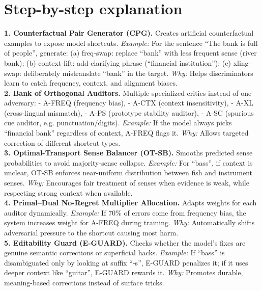 \documentclass[11pt]{article}
\begin{document}
\section{Step-by-step explanation}
\textbf{1. Counterfactual Pair Generator (CPG).}  
Creates artificial counterfactual examples to expose model shortcuts.  
\emph{Example:} For the sentence ``The bank is full of people'', generate:  
(a) freq-swap: replace ``bank'' with less frequent sense (river bank);  
(b) context-lift: add clarifying phrase (``financial institution'');  
(c) xling-swap: deliberately mistranslate ``bank'' in the target.  
\emph{Why:} Helps discriminators learn to catch frequency, context, and alignment biases.\\

\textbf{2. Bank of Orthogonal Auditors.}  
Multiple specialized critics instead of one adversary:  
- A-FREQ (frequency bias),  
- A-CTX (context insensitivity),  
- A-XL (cross-lingual mismatch),  
- A-PS (prototype stability auditor),  
- A-SC (spurious cue auditor, e.g. punctuation/digits).  
\emph{Example:} If the model always picks ``financial bank'' regardless of context, A-FREQ flags it.  
\emph{Why:} Allows targeted correction of different shortcut types.\\

\textbf{3. Optimal-Transport Sense Balancer (OT-SB).}  
Smooths predicted sense probabilities to avoid majority-sense collapse.  
\emph{Example:} For ``bass'', if context is unclear, OT-SB enforces near-uniform distribution between fish and instrument senses.  
\emph{Why:} Encourages fair treatment of senses when evidence is weak, while respecting strong context when available.\\

\textbf{4. Primal--Dual No-Regret Multiplier Allocation.}  
Adapts weights for each auditor dynamically.  
\emph{Example:} If 70\% of errors come from frequency bias, the system increases weight for A-FREQ during training.  
\emph{Why:} Automatically shifts adversarial pressure to the shortcut causing most harm.\\

\textbf{5. Editability Guard (E-GUARD).}  
Checks whether the model’s fixes are genuine semantic corrections or superficial hacks.  
\emph{Example:} If ``bass'' is disambiguated only by looking at suffix ``-s'', E-GUARD penalizes it; if it uses deeper context like ``guitar'', E-GUARD rewards it.  
\emph{Why:} Promotes durable, meaning-based corrections instead of surface tricks.\\
\end{document}
